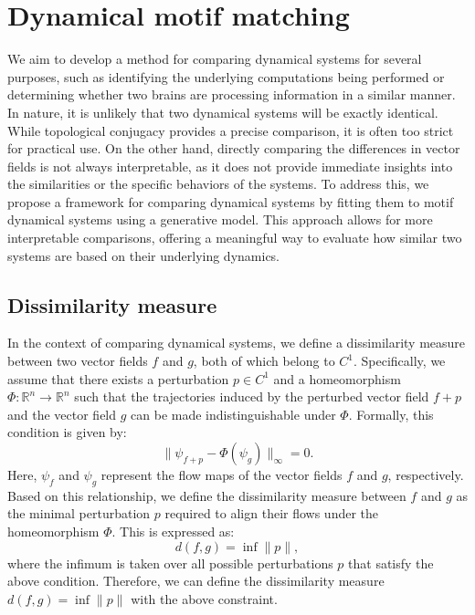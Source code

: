 \documentclass{article}
\theoremstyle{definition} \newtheorem{definition}{Definition}  \newtheorem{example}{Example}
\theoremstyle{remark} \newtheorem{remark}{Remark}
\newcounter{ct}
\begin{document}
\section{Dynamical motif matching}\label{sec:dmm}
We aim to develop a method for comparing dynamical systems for several purposes, such as identifying the underlying computations being performed or determining whether two brains are processing information in a similar manner. In nature, it is unlikely that two dynamical systems will be exactly identical.
 While topological conjugacy provides a precise comparison, it is often too strict for practical use.
 On the other hand, directly comparing the differences in vector fields is not always interpretable, as it does not provide immediate insights into the similarities or the specific behaviors of the systems.
  To address this, we propose a framework for comparing dynamical systems by fitting them to motif dynamical systems using a generative model.
   This approach allows for more interpretable comparisons, offering a meaningful way to evaluate how similar two systems are based on their underlying dynamics.



\subsection{Dissimilarity measure}
In the context of comparing dynamical systems, we define a dissimilarity measure between two vector fields \( f \) and \( g \), both of which belong to \( C^1 \). Specifically, we assume that there exists a perturbation \( p \in C^1 \) and a homeomorphism \( \Phi: \mathbb{R}^n \rightarrow \mathbb{R}^n \) such that the trajectories induced by the perturbed vector field \( f + p \) and the vector field \( g \) can be made indistinguishable under \( \Phi \). Formally, this condition is given by:
\begin{equation}\label{eq:}
\|\psi_{f+p} - \Phi(\psi_{g})\|_\infty = 0.
\end{equation}
Here, \( \psi_{f} \) and \( \psi_{g} \) represent the flow maps of the vector fields \( f \) and \( g \), respectively. Based on this relationship, we define the dissimilarity measure between \( f \) and \( g \) as the minimal perturbation \( p \) required to align their flows under the homeomorphism \( \Phi \). This is expressed as:
\begin{equation}
d(f, g) = \inf \|p\|,  %
\end{equation}
where the infimum is taken over all possible perturbations \( p \) that satisfy the above condition.
Therefore, we can define the dissimilarity measure $d(f,g) = \inf \|p\|$ with the above constraint.
\end{document}
